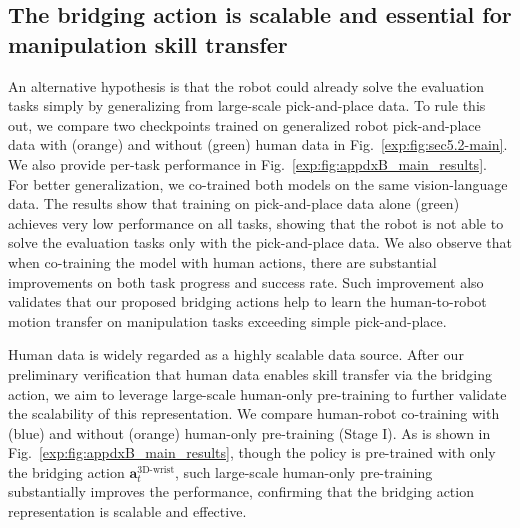 \subsection{The bridging action is scalable and essential for manipulation skill transfer}
\label{exp:sec:principle}





%
An alternative hypothesis is that the robot could already solve the evaluation tasks simply by generalizing from large-scale pick-and-place data.
%
To rule this out, we compare two checkpoints trained on generalized robot pick-and-place data with (\textcolor[RGB]{232, 168, 143}{orange}) and without (\textcolor[RGB]{140, 180, 150}{green}) human data in Fig.~\ref{exp:fig:sec5.2-main}.
% 
We also provide per-task performance in Fig.~\ref{exp:fig:appdxB_main_results}.
% 
For better generalization, we co-trained both models on the same vision-language data.
% 
The results show that training on pick-and-place data alone (\textcolor[RGB]{140, 180, 150}{green}) achieves very low performance on all tasks, showing that the robot is not able to solve the evaluation tasks only with the pick-and-place data.
% 
We also observe that when co-training the model with human actions, there are substantial improvements on both task progress and success rate.
% 
Such improvement also validates that our proposed bridging actions help to learn the human-to-robot motion transfer on manipulation tasks exceeding simple pick-and-place.




% 
Human data is widely regarded as a highly scalable data source. 
% 
After our preliminary verification that human data enables skill transfer via the bridging action, we aim to leverage large-scale human-only pre-training to further validate the scalability of this representation.
%
We compare human-robot co-training with (\textcolor[RGB]{129, 157, 195}{blue}) and without (\textcolor[RGB]{232, 168, 143}{orange}) human-only pre-training (Stage I).
% 
As is shown in Fig.~\ref{exp:fig:appdxB_main_results}, though the policy is pre-trained with only the bridging action $\mathbf{a}^{\text{3D-wrist}}_{t}$, such large-scale human-only pre-training substantially improves the performance, confirming that the bridging action representation is scalable and effective.


